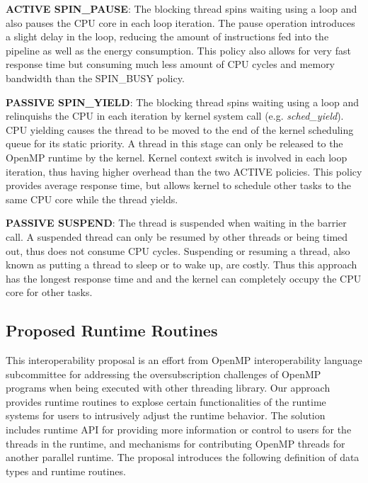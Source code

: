 	{\bf ACTIVE SPIN\_PAUSE}: The blocking thread spins waiting using a loop and also pauses the CPU core in 
	each loop iteration. The pause operation introduces a slight delay in the loop, reducing the amount 
	of instructions fed into the pipeline as well as the energy consumption. This policy also allows 
	for very fast response time but consuming much less amount of CPU cycles 
	and memory bandwidth than the SPIN\_BUSY policy.

	{\bf PASSIVE SPIN\_YIELD}:  The blocking thread spins waiting using a loop and 
	relinquishs the CPU in each iteration by kernel system call (e.g. {\em sched\_yield}). CPU yielding causes
	the thread to be moved to the end of the kernel scheduling queue for its static priority. A thread in this 
		stage can only be released to the OpenMP runtime by the kernel. Kernel context switch is involved
		in each loop iteration, thus having higher overhead than the two ACTIVE policies. 
		This policy provides average response time, but allows kernel to schedule other tasks to the same
		CPU core while the thread yields. 

	{\bf PASSIVE SUSPEND}: The thread is suspended when waiting in the barrier call. A suspended thread can only
	be resumed by other threads or being timed out, thus does not consume CPU cycles. 
	Suspending or resuming a thread, also known as putting a thread to sleep or to wake up,  are costly. Thus this approach has the longest response time and 
	and the kernel can completely occupy the CPU core for other tasks.

\subsection{Proposed Runtime Routines} 
This interoperability proposal is an effort from OpenMP interoperability language subcommittee for addressing
the oversubscription challenges of OpenMP programs when being executed with other threading library. 
Our approach provides runtime routines to explose certain functionalities of the runtime systems for users to 
intrusively adjust the runtime behavior. 
The solution includes runtime API for providing more information or control to users 
for the threads in the runtime, 
and mechanisms for 
contributing OpenMP threads for another parallel runtime. 
The proposal introduces the following definition of data types and runtime routines. 

